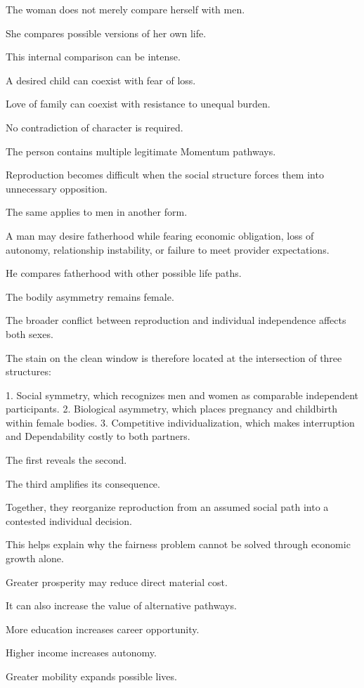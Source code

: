 The woman does not merely compare herself with men.

She compares possible versions of her own life.

This internal comparison can be intense.

A desired child can coexist with fear of loss.

Love of family can coexist with resistance to unequal burden.

No contradiction of character is required.

The person contains multiple legitimate Momentum pathways.

Reproduction becomes difficult when the social structure forces them into unnecessary opposition.

The same applies to men in another form.

A man may desire fatherhood while fearing economic obligation, loss of autonomy, relationship instability, or failure to meet provider expectations.

He compares fatherhood with other possible life paths.

The bodily asymmetry remains female.

The broader conflict between reproduction and individual independence affects both sexes.

The stain on the clean window is therefore located at the intersection of three structures:

1. Social symmetry, which recognizes men and women as comparable independent participants.
2. Biological asymmetry, which places pregnancy and childbirth within female bodies.
3. Competitive individualization, which makes interruption and Dependability costly to both partners.

The first reveals the second.

The third amplifies its consequence.

Together, they reorganize reproduction from an assumed social path into a contested individual decision.

This helps explain why the fairness problem cannot be solved through economic growth alone.

Greater prosperity may reduce direct material cost.

It can also increase the value of alternative pathways.

More education increases career opportunity.

Higher income increases autonomy.

Greater mobility expands possible lives.

